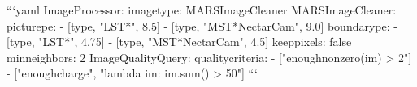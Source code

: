 \markdownRendererDocumentBegin
```yaml ImageProcessor: imagetype: MARSImageCleaner\markdownRendererInterblockSeparator
{}MARSImageCleaner: picturepe: - [type, "LST*", 8.5] - [type, "MST*NectarCam", 9.0] boundarype: - [type, "LST*", 4.75] - [type, "MST*NectarCam", 4.5] keeppixels: false minneighbors: 2\markdownRendererInterblockSeparator
{}ImageQualityQuery: quality\markdownRendererUnderscore{}criteria: - ["enoughnonzero(im) > 2"] - ["enough\markdownRendererUnderscore{}charge", "lambda im: im.sum() > 50"] ```\markdownRendererDocumentEnd